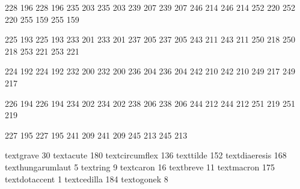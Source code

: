 
\startmapping[8r] 

 228 196  228 196  
 235 203  235 203
 239 207  239 207
 246 214  246 214
 252 220  252 220
 255 159  255 159

 225 193  225 193
 233 201  233 201
 237 205  237 205
 243 211  243 211
 250 218  250 218
 253 221  253 221

 224 192  224 192
 232 200  232 200
 236 204  236 204
 242 210  242 210
 249 217  249 217

 226 194  226 194
 234 202  234 202
 238 206  238 206
 244 212  244 212
 251 219  251 219

 227 195  227 195
 241 209  241 209
 245 213  245 213

\stopmapping

\startencoding[8r]

 textgrave          30
 textacute         180
 textcircumflex    136
 texttilde         152
 textdiaeresis     168
 texthungarumlaut    5
 textring            9
 textcaron          16
 textbreve          11
 textmacron        175
 textdotaccent       1
 textcedilla       184 
 textogonek          8

